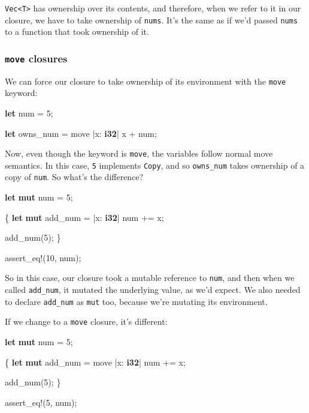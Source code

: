 \documentclass[a4paper,]{book}
\newenvironment{Shaded}{\begin{snugshade}}{\end{snugshade}}
\newcommand{\KeywordTok}[1]{\textcolor[rgb]{0.13,0.29,0.53}{\textbf{{#1}}}}
\newcommand{\DecValTok}[1]{\textcolor[rgb]{0.00,0.00,0.81}{{#1}}}
\newcommand{\OtherTok}[1]{\textcolor[rgb]{0.56,0.35,0.01}{{#1}}}
\newcommand{\NormalTok}[1]{{#1}}
\begin{document}
\texttt{Vec\textless{}T\textgreater{}} has ownership over its contents,
and therefore, when we refer to it in our closure, we have to take
ownership of \texttt{nums}. It's the same as if we'd passed
\texttt{nums} to a function that took ownership of it.

\subsubsection{\texorpdfstring{\texttt{move}
closures}{move closures}}\label{move-closures}

We can force our closure to take ownership of its environment with the
\texttt{move} keyword:

\begin{Shaded}
\begin{Highlighting}[]
\KeywordTok{let} \NormalTok{num = }\DecValTok{5}\NormalTok{;}

\KeywordTok{let} \NormalTok{owns_num = move |x: }\KeywordTok{i32}\NormalTok{| x + num;}
\end{Highlighting}
\end{Shaded}

Now, even though the keyword is \texttt{move}, the variables follow
normal move semantics. In this case, \texttt{5} implements
\texttt{Copy}, and so \texttt{owns\_num} takes ownership of a copy of
\texttt{num}. So what's the difference?

\begin{Shaded}
\begin{Highlighting}[]
\KeywordTok{let} \KeywordTok{mut} \NormalTok{num = }\DecValTok{5}\NormalTok{;}

\NormalTok{\{}
    \KeywordTok{let} \KeywordTok{mut} \NormalTok{add_num = |x: }\KeywordTok{i32}\NormalTok{| num += x;}

    \NormalTok{add_num(}\DecValTok{5}\NormalTok{);}
\NormalTok{\}}

\OtherTok{assert_eq!}\NormalTok{(}\DecValTok{10}\NormalTok{, num);}
\end{Highlighting}
\end{Shaded}

So in this case, our closure took a mutable reference to \texttt{num},
and then when we called \texttt{add\_num}, it mutated the underlying
value, as we'd expect. We also needed to declare \texttt{add\_num} as
\texttt{mut} too, because we're mutating its environment.

If we change to a \texttt{move} closure, it's different:

\begin{Shaded}
\begin{Highlighting}[]
\KeywordTok{let} \KeywordTok{mut} \NormalTok{num = }\DecValTok{5}\NormalTok{;}

\NormalTok{\{}
    \KeywordTok{let} \KeywordTok{mut} \NormalTok{add_num = move |x: }\KeywordTok{i32}\NormalTok{| num += x;}

    \NormalTok{add_num(}\DecValTok{5}\NormalTok{);}
\NormalTok{\}}

\OtherTok{assert_eq!}\NormalTok{(}\DecValTok{5}\NormalTok{, num);}
\end{Highlighting}
\end{Shaded}
\end{document}
